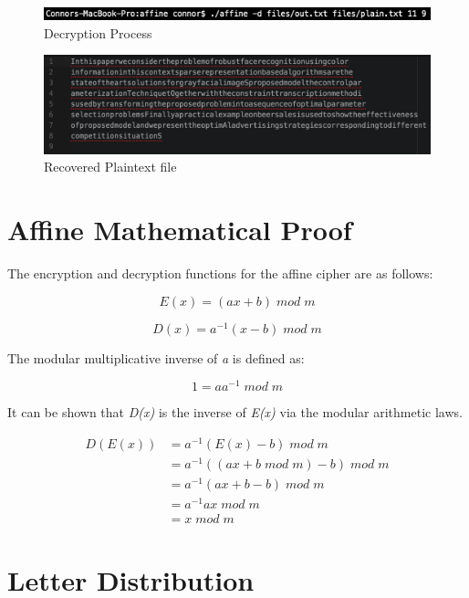 \documentclass[]{article}
\begin{document}
\begin{figure}[H]
	\includegraphics[width=\textwidth]{affine_decrypt.png}
	\caption{Decryption Process}
	\centering
\end{figure}

\begin{figure}[H]
	\includegraphics[width=\textwidth]{affine_plaintext.png}
	\caption{Recovered Plaintext file}
	\centering
\end{figure}

\section*{Affine Mathematical Proof}

The encryption and decryption functions for the affine cipher are as follows:

$$E(x)=(ax+b)\;mod\;m$$

$$D(x)=a^{-1}(x-b)\;mod\;m$$

\vspace{0.5cm}

The modular multiplicative inverse of \textit{a} is defined as:

$$1=aa^{-1}\;mod\;m$$

It can be shown that \textit{D(x)} is the inverse of \textit{E(x)} via the modular arithmetic laws.

\begin{equation*}
\begin{split}
D(E(x)) & = a^{-1}(E(x)-b)\;mod\;m \\
& = a^{-1}(( ax+b\;mod\;m )-b)\;mod\;m \\
& = a^{-1} (ax+b-b) \;mod\;m \\
& = a^{-1}ax\;mod\;m \\
& = x\;mod\;m
\end{split}
\end{equation*}




\section*{Letter Distribution}
\end{document}
